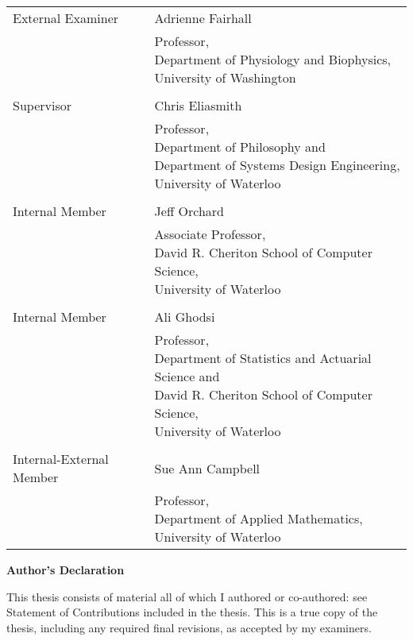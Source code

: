\noindent\begin{tabular}{@{}ll}\\
    External Examiner & Adrienne Fairhall \\ & \pbox{20cm}{
        Professor, \\
        Department of Physiology and Biophysics, \\
        University of Washington} \\ \\
    Supervisor & Chris Eliasmith \\ & \pbox{20cm}{
        Professor, \\
        Department of Philosophy and \\
        Department of Systems Design Engineering, \\
        University of Waterloo} \\ \\
    Internal Member & Jeff Orchard \\ & \pbox{20cm}{
        Associate Professor, \\
        David R. Cheriton School of Computer Science, \\
        University of Waterloo} \\ \\
    Internal Member & Ali Ghodsi \\ & \pbox{20cm}{
        Professor, \\
        Department of Statistics and Actuarial Science and \\
        David R. Cheriton School of Computer Science, \\
        University of Waterloo} \\ \\
    Internal-External Member & Sue Ann Campbell \\ & \pbox{20cm}{
        Professor, \\
        Department of Applied Mathematics, \\
        University of Waterloo}
\end{tabular}

\cleardoublepage

\begin{center}\textbf{Author's Declaration}\end{center}

\noindent
This thesis consists of material all of which I authored or co-authored: see Statement of Contributions included in the thesis. This is a true copy of the thesis, including any required final revisions, as accepted by my examiners.

